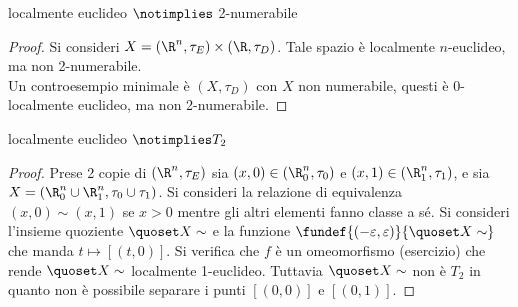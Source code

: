 \begin{prop}
localmente euclideo $\notimplies$ 2-numerabile
\end{prop}
\begin{proof} 
Si consideri $X = (\R^n, \tau _E) \times (\R, \tau _D)$.  Tale spazio è localmente $n$-euclideo, ma non 2-numerabile. \\
Un controesempio minimale è $(X, \tau _D)$ con $X$ non numerabile, questi è 0-localmente euclideo, ma non 2-numerabile.
\end{proof}

\begin{prop}
localmente euclideo $\notimplies T_2$
\end{prop}
\begin{proof}
Prese 2 copie di $(\R^n, \tau _E)$ sia $(x,0) \in (\R^n_0, \tau _0)$  e $(x,1) \in (\R^n_1, \tau _1)$, e sia $X = (\R^n_0 \cup \R^n_1, \tau _0 \cup \tau _1)$. Si consideri la relazione di equivalenza $(x,0)\sim(x,1)$ se $x>0$ mentre gli altri elementi fanno classe a sé. Si consideri l'insieme quoziente $\quoset X\sim$  e la funzione $\fundef{(-\varepsilon,\varepsilon)}{\quoset X\sim}$ che manda $t \mapsto [(t,0)]$. Si verifica che $f$ è un omeomorfismo (esercizio) che rende $\quoset X\sim$ localmente 1-euclideo. Tuttavia $\quoset X\sim$ non è $T_2$ in quanto non è possibile separare i punti $[(0,0)]$ e $[(0,1)].$
\end{proof}


